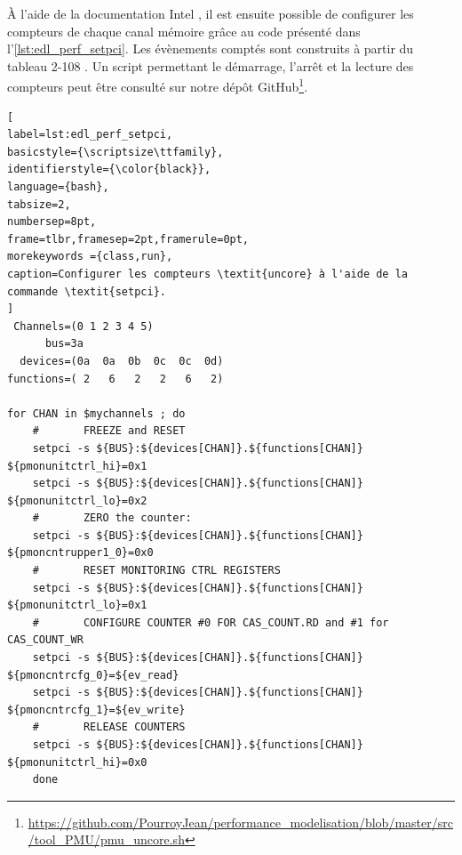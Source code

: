         À l'aide de la documentation Intel \cite{Intel2017b}, il est ensuite possible de configurer les compteurs de chaque canal mémoire grâce au code présenté dans l'\autoref{lst:edl_perf_setpci}. Les évènements comptés sont construits à partir du tableau 2-108 \cite{Intel2017b}. Un script permettant le démarrage, l'arrêt et la lecture des compteurs peut être consulté sur notre dépôt GitHub\footnote{\url{https://github.com/PourroyJean/performance_modelisation/blob/master/src/tool_PMU/pmu_uncore.sh}}. 


\begin{minipage}{\linewidth}
\begin{lstlisting}[
label=lst:edl_perf_setpci,
basicstyle={\scriptsize\ttfamily},
identifierstyle={\color{black}},
language={bash},
tabsize=2,
numbersep=8pt,
frame=tlbr,framesep=2pt,framerule=0pt,
morekeywords ={class,run},
caption=Configurer les compteurs \textit{uncore} à l'aide de la commande \textit{setpci}.
]
 Channels=(0 1 2 3 4 5)
      bus=3a
  devices=(0a  0a  0b  0c  0c  0d)
functions=( 2   6   2   2   6   2)

for CHAN in $mychannels ; do
    #       FREEZE and RESET
    setpci -s ${BUS}:${devices[CHAN]}.${functions[CHAN]} ${pmonunitctrl_hi}=0x1        
    setpci -s ${BUS}:${devices[CHAN]}.${functions[CHAN]} ${pmonunitctrl_lo}=0x2
    #       ZERO the counter:        
    setpci -s ${BUS}:${devices[CHAN]}.${functions[CHAN]} ${pmoncntrupper1_0}=0x0  
    #       RESET MONITORING CTRL REGISTERS        
    setpci -s ${BUS}:${devices[CHAN]}.${functions[CHAN]} ${pmonunitctrl_lo}=0x1
    #       CONFIGURE COUNTER #0 FOR CAS_COUNT.RD and #1 for CAS_COUNT_WR        
    setpci -s ${BUS}:${devices[CHAN]}.${functions[CHAN]} ${pmoncntrcfg_0}=${ev_read}        
    setpci -s ${BUS}:${devices[CHAN]}.${functions[CHAN]} ${pmoncntrcfg_1}=${ev_write}
    #       RELEASE COUNTERS        
    setpci -s ${BUS}:${devices[CHAN]}.${functions[CHAN]} ${pmonunitctrl_hi}=0x0
    done
\end{lstlisting}
\end{minipage}
    



